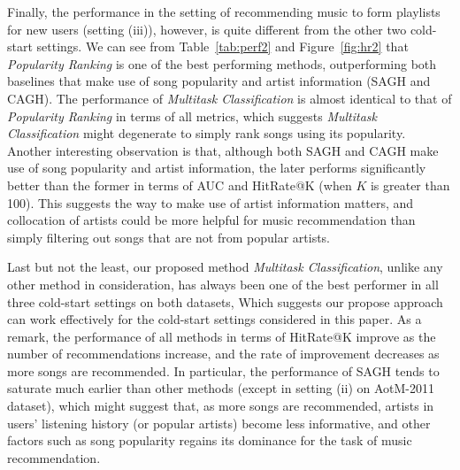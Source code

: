 Finally, the performance in the setting of recommending music to form playlists for new users (setting (iii)),
however, is quite different from the other two cold-start settings.
%
We can see from Table~\ref{tab:perf2} and Figure~\ref{fig:hr2} that {\it Popularity Ranking} is one of the best performing methods,
outperforming both baselines that make use of song popularity and artist information (\ie SAGH and CAGH).
The performance of {\it Multitask Classification} is almost identical to that of {\it Popularity Ranking} in terms of all metrics,
which suggests {\it Multitask Classification} might degenerate to simply rank songs using its popularity.
Another interesting observation is that, although both SAGH and CAGH make use of song popularity and artist information,
the later performs significantly better than the former in terms of AUC and HitRate@K (when $K$ is greater than 100).
This suggests the way to make use of artist information matters,
and collocation of artists could be more helpful for music recommendation than simply filtering out songs 
that are not from popular artists.

Last but not the least, our proposed method {\it Multitask Classification}, unlike any other method in consideration,
has always been one of the best performer in all three cold-start settings on both datasets,
Which suggests our propose approach can work effectively for the cold-start settings considered in this paper.
As a remark, the performance of all methods in terms of HitRate@K improve as the number of recommendations increase,
and the rate of improvement decreases as more songs are recommended.
In particular, the performance of SAGH tends to saturate much earlier than other methods (except in setting (ii) on AotM-2011 dataset),
which might suggest that, as more songs are recommended, artists in users' listening history (or popular artists) become less informative,
and other factors such as song popularity regains its dominance for the task of music recommendation.



